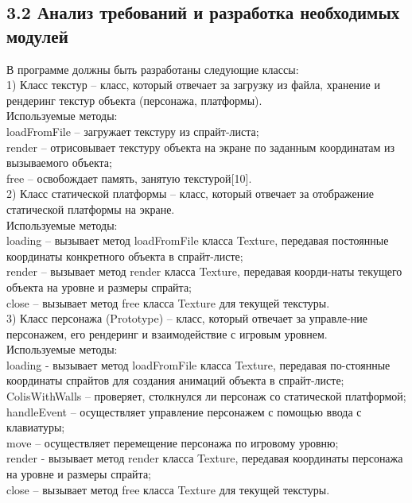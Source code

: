 \documentclass[14pt,a4paper]{extreport}
\begin{document}
	\subsection*{\normalsize\hspace{4ex}3.2 Анализ требований и разработка необходимых модулей}
	\hspace{4ex}В программе должны быть разработаны следующие классы:
\\1)	Класс текстур  – класс, который отвечает за загрузку из файла, хранение и рендеринг текстур объекта (персонажа, платформы).
\\Используемые методы:
\\loadFromFile – загружает текстуру из спрайт-листа;
\\ render – отрисовывает текстуру объекта на экране по заданным координатам из вызываемого объекта;
\\free – освобождает память, занятую текстурой[10].
\\2)	Класс статической платформы – класс, который отвечает за отображение статической платформы на экране.
\\Используемые методы:
\\loading – вызывает метод loadFromFile класса Texture, передавая постоянные координаты конкретного объекта в спрайт-листе;
\\render – вызывает метод render класса Texture, передавая коорди-наты текущего объекта на уровне и размеры спрайта;
\\close – вызывает метод free класса Texture для текущей текстуры.
\\3)	Класс персонажа (Prototype) – класс, который отвечает за управле-ние персонажем, его рендеринг и взаимодействие с игровым уровнем.
\\Используемые методы:
\\loading - вызывает метод loadFromFile класса Texture, передавая по-стоянные координаты спрайтов для создания анимаций объекта в спрайт-листе;
\\ColisWithWalls – проверяет, столкнулся ли персонаж со статической платформой;
\\handleEvent – осуществляет управление персонажем с помощью ввода с клавиатуры;
\\move – осуществляет перемещение персонажа по игровому уровню;
\\render -  вызывает метод render класса Texture, передавая координаты персонажа на уровне и размеры спрайта;
\\close – вызывает метод free класса Texture для текущей текстуры.
\end{document}
